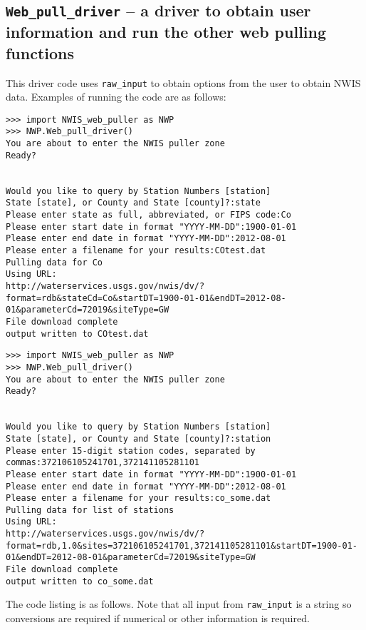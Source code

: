 \documentclass[12pt]{article}
\begin{document}
\subsection{\texttt{Web\_pull\_driver} -- a driver to obtain user information and run the other web pulling functions}
This driver code uses \texttt{raw\_input} to obtain options from the user to obtain NWIS data. Examples of running the code are as follows:
\begin{tiny}
\begin{Verbatim}[frame=single]
>>> import NWIS_web_puller as NWP
>>> NWP.Web_pull_driver()
You are about to enter the NWIS puller zone
Ready?


Would you like to query by Station Numbers [station] 
State [state], or County and State [county]?:state
Please enter state as full, abbreviated, or FIPS code:Co
Please enter start date in format "YYYY-MM-DD":1900-01-01
Please enter end date in format "YYYY-MM-DD":2012-08-01
Please enter a filename for your results:COtest.dat
Pulling data for Co
Using URL:
http://waterservices.usgs.gov/nwis/dv/?format=rdb&stateCd=Co&startDT=1900-01-01&endDT=2012-08-01&parameterCd=72019&siteType=GW
File download complete
output written to COtest.dat
\end{Verbatim}
\end{tiny}
\begin{tiny}
\begin{Verbatim}[frame=single]
>>> import NWIS_web_puller as NWP
>>> NWP.Web_pull_driver()
You are about to enter the NWIS puller zone
Ready?


Would you like to query by Station Numbers [station] 
State [state], or County and State [county]?:station
Please enter 15-digit station codes, separated by commas:372106105241701,372141105281101
Please enter start date in format "YYYY-MM-DD":1900-01-01
Please enter end date in format "YYYY-MM-DD":2012-08-01
Please enter a filename for your results:co_some.dat
Pulling data for list of stations
Using URL:
http://waterservices.usgs.gov/nwis/dv/?format=rdb,1.0&sites=372106105241701,372141105281101&startDT=1900-01-01&endDT=2012-08-01&parameterCd=72019&siteType=GW
File download complete
output written to co_some.dat
\end{Verbatim}
\end{tiny}
The code listing is as follows. Note that all input from \texttt{raw\_input} is a string so conversions are required if numerical or other information is required.
\begin{center}
	
\end{center}
\end{document}
